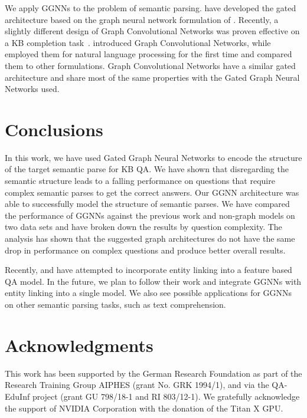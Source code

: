 \documentclass[11pt]{article}
\begin{document}
We apply GGNNs to the problem of semantic parsing.  have developed the gated architecture based on the graph neural network formulation of . Recently, a slightly different design of Graph Convolutional Networks  was proven effective on a KB completion task~\cite{Schlichtkrull2018}.  introduced Graph Convolutional Networks, while  employed them for natural language processing for the first time and compared them to other formulations. Graph Convolutional Networks have a similar gated architecture and share most of the same properties with the Gated Graph Neural Networks used.
 

\section{Conclusions}
In this work, we have used Gated Graph Neural Networks to encode the structure of the target semantic parse for KB QA. We have shown that disregarding the semantic structure leads to a falling performance on questions that require complex semantic parses to get the correct answers. Our GGNN architecture was able to successfully model the structure of semantic parses. We have compared the performance of GGNNs against the previous work and non-graph models on two data sets and have broken down the results by question complexity. The analysis has shown that the suggested graph architectures do not have the same drop in performance on complex questions and produce better overall results.

Recently,  and  have attempted to incorporate entity linking into a feature based QA model. In the future, we plan to follow their work and  integrate GGNNs with entity linking into a single model. We also see possible applications for GGNNs on other semantic parsing tasks, such as text comprehension.

\section*{Acknowledgments}
This work has been supported by the German Research Foundation as part of the Research Training Group AIPHES (grant No. GRK 1994/1), and via the QA-EduInf project (grant GU 798/18-1 and RI 803/12-1). 
We gratefully acknowledge the support of NVIDIA Corporation with the donation of the Titan X GPU.



\end{document}
